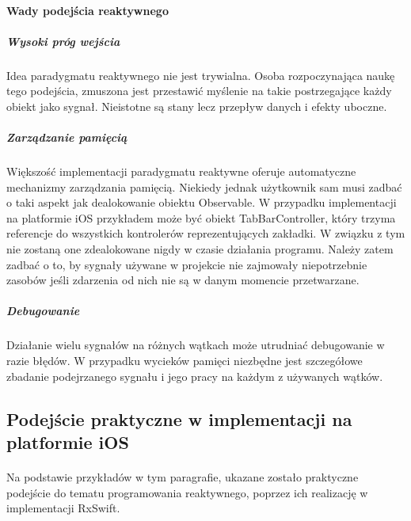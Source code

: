\documentclass[12pt,oneside,a4paper]{report}
\begin{document}
\paragraph{Wady podejścia reaktywnego}
\subparagraph{Wysoki próg wejścia } Idea paradygmatu reaktywnego nie jest trywialna. Osoba rozpoczynająca naukę tego podejścia, zmuszona jest przestawić myślenie na takie postrzegające każdy obiekt jako sygnał. Nieistotne są stany lecz przepływ danych i efekty uboczne. 
\subparagraph{Zarządzanie pamięcią } Większość implementacji paradygmatu reaktywne oferuje automatyczne mechanizmy zarządzania pamięcią. Niekiedy jednak użytkownik sam musi zadbać o taki aspekt jak dealokowanie obiektu Observable. W przypadku implementacji na platformie iOS przykładem może być obiekt TabBarController, który trzyma referencje do wszystkich kontrolerów reprezentujących zakładki. W związku z tym nie zostaną one zdealokowane nigdy w czasie działania programu. Należy zatem zadbać o to, by sygnały używane w projekcie nie zajmowały niepotrzebnie zasobów jeśli zdarzenia od nich nie są w danym momencie przetwarzane.
\subparagraph{Debugowanie } Działanie wielu sygnałów na różnych wątkach może utrudniać debugowanie w razie błędów. W przypadku wycieków pamięci niezbędne jest szczegółowe zbadanie podejrzanego sygnału i jego pracy na każdym z używanych wątków.
\subsection{Podejście praktyczne w implementacji na platformie iOS}
\paragraph{}Na podstawie przykładów\cite{examples} w tym paragrafie, ukazane zostało praktyczne podejście do tematu programowania reaktywnego, poprzez ich realizację w implementacji RxSwift.
\end{document}
